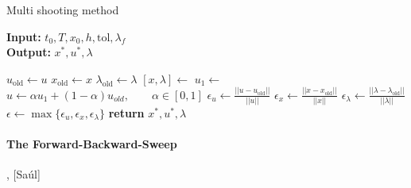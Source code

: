 \begin{algorithm}
  \caption{Multi shooting method } \label{alg:multishooting}
  \begin{flushleft}
    \hspace*{\algorithmicindent} \textbf{Input:} 
    $t_0, T, x_0, h, \text{tol}, \lambda_{f}$ \\
    \hspace*{\algorithmicindent} \textbf{Output:} 
    $x^*, u^*, \lambda$
  \end{flushleft}
  \begin{algorithmic}
    \State $u_{\text{old}} \gets u$ 
    \State $x_{\text{old}} \gets x$ 
    \State $\lambda_{\text{old}} \gets \lambda $
    \State $ 
    [x, \lambda] \gets$
    \State $u_1 \gets$ 
    \State 
    $u \gets \alpha u_1 + (1-\alpha)u_{old}, 
    \qquad \alpha \in [0, 1]$
    \State 
    $\epsilon_u \gets \displaystyle 
    \frac{||u - u_{\text{old}}||}{||u||}$
    \State 
    $\epsilon_x \gets \displaystyle 
    \frac{||x - x_{\text{old}}||}{||x||}$
    \State 
    $\epsilon_{\lambda} \gets \displaystyle 
    \frac{||\lambda - 
      \lambda_{\text{old}}||}{||\lambda||}$
    \State 
    $\epsilon \gets 
    \max{ 
      \{ \epsilon_u, \epsilon_x, \epsilon_{\lambda} \}
    }$
    \EndWhile\label{}
    \State \textbf{return} $ x^*, u^*, \lambda$
    \EndProcedure
  \end{algorithmic}
\end{algorithm}

\paragraph{The Forward-Backward-Sweep}
\cite{hackbusch1978numerical}
\cite*{Pesch1989} , [Saúl]
